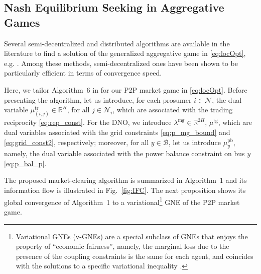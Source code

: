 \documentclass{IEEEtran}  %
\newtheorem{assumption}{Assumption}
\newcommand{\mc}{\mathcal}
\newcommand{\bb}{\mathbb}
\newcommand{\0}{\mathbf{0}}
\newcommand{\1}{\mathbf{1}}
\begin{document}
\subsection{Nash Equilibrium Seeking in Aggregative Games}
Several semi-decentralized and distributed algorithms are available in the literature to find a solution of the generalized aggregative game in \eqref{eq:locOpt}, e.g. \cite{paccagnan2019,belgioioso2020semi,belgioioso2020b,
gadjov2020single,bianchi2020fast}. Among these methods, semi-decentralized ones \cite{belgioioso2020semi} have been shown to be particularly efficient in terms of convergence speed. %

Here, we tailor Algorithm~6 in \cite{belgioioso2020semi} for our P2P market game in \eqref{eq:locOpt}. Before presenting the algorithm, let us introduce, for each prosumer $i\in\mc N$, the dual variable $\mu^{\text{tr}}_{(i,j)} \in \bb R^{H}$, for all $j\in\mc N_i$, which are associated with the trading reciprocity \eqref{eq:rep_const}. For the DNO, we introduce $\lambda^{\text{mg}}\in \bb R^{2H}$, $\mu^{\text{tg}}$, which are dual variables associated with the grid constraints \eqref{eq:p_mg_bound} and \eqref{eq:grid_const2}, respectively; moreover, for all $y \in \mc B$, let us introduce $\mu_{y}^{\text{pb}}$, namely, the dual variable associated with the power balance constraint on bus $y$ \eqref{eq:p_bal_p}.

\smallskip 
The proposed market-clearing algorithm is summarized in Algorithm~1 and its information flow is illustrated in Fig.~\ref{fig:IFC}. 
%
The next proposition shows its global convergence of Algorithm~1 to a variational\footnote{Variational GNEs (v-GNEs) are  a special subclass of GNEs that enjoys the property of ``economic fairness”, namely, the marginal loss due to the presence of the coupling constraints is the same for each
agent, and coincides with the solutions to a specific variational inequality \cite{kulkarni2012variational}.} GNE of the P2P market game. %
\end{document}
